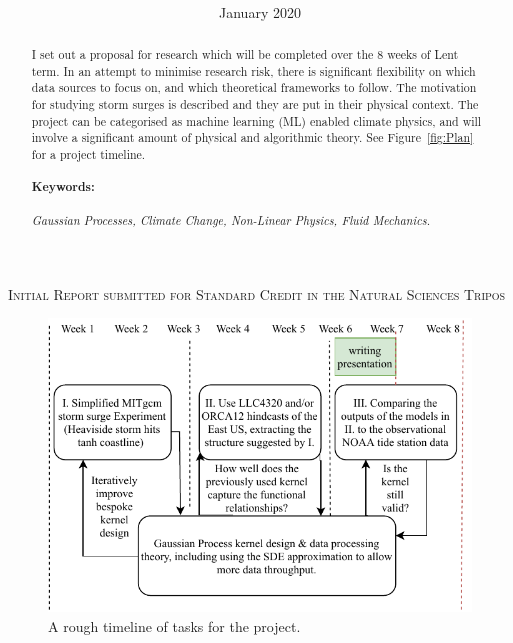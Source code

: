\documentclass[usenames, dvipsnames, twocolumn]{article}
\date{January 2020}
\title{\vspace*{-100pt}\textbf{\mytitle}\vspace{-10pt}}
\author{\penname \\  \supervisor }
\begin{document}
  \begin{@twocolumnfalse}
    \vspace{-25pt}
  \maketitle
  \setcounter{page}{1}
    \textsc{Initial Report submitted for Standard Credit in
the Natural Sciences Tripos}
    \begin{abstract}
     I set out a proposal for research which will be completed over the 8 weeks of Lent term.
     In an attempt to minimise research risk, there is significant flexibility on which data sources to focus on,
      and which theoretical frameworks to follow.
      The motivation for studying storm surges is described and they are put in their physical context.
      The project can be categorised as machine learning (ML) enabled climate physics,
       and will involve a significant amount of physical and algorithmic theory.
       See Figure~\ref{fig:Plan} for a project timeline.

\paragraph{Keywords:} \textit{Gaussian Processes, Climate Change,
 Non-Linear Physics, Fluid Mechanics.}
    \vspace{20pt}
    \end{abstract}

  \end{@twocolumnfalse}
\vspace{-30pt}
\noindent
\begin{figure}[htb!]
    \centering
    \includegraphics[width=\linewidth]{images/proposal/PartIIIProjPlan.pdf}
    \caption{A rough timeline of tasks for the project.}
    \label{fig:Plan}
\end{figure}
\end{document}
